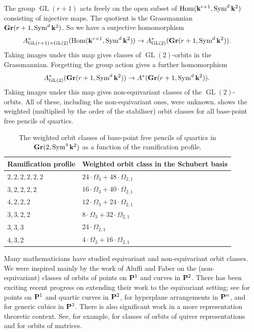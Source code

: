 \documentclass[11pt]{amsart}
\renewcommand {\P}{{\bf P}}
\providecommand {\Gr}{{\bf Gr}}
\providecommand{\GL}{\operatorname{GL}}
\providecommand{\Hom}{\operatorname{Hom}}
\providecommand{\Sym}{\operatorname{Sym}}
\begin{document}
The group \(\GL(r+1)\) acts freely on the open subset of \(\Hom(\k^{r+1}, \Sym^d\k^2)\) consisting of injective maps.
The quotient is the Grassmannian \(\Gr(r+1, \Sym^d\k^2)\).
So we have a surjective homomorphism
\begin{equation}\label{eq:homgrass}
  A^*_{\GL(r+1) \times \GL(2)}(\Hom(\k^{r+1}, \Sym^d\k^2)) \to A^*_{\GL(2)}(\Gr(r+1, \Sym^d\k^2)).
\end{equation}
Taking images under this map gives classes of \(\GL(2)\)-orbits in the Grassmannian.
Forgetting the group action gives a further homomorphism
\begin{equation}\label{eq:homnon}
  A^*_{\GL(2)}(\Gr(r+1, \Sym^d\k^2)) \to A^*(\Gr(r+1, \Sym^d\k^2)).
\end{equation}
Taking images under this map gives non-equivariant classes of the \(\GL(2)\)-orbits.
All of these, including the non-equivariant ones, were unknown.
 shows the weighted (multiplied by the order of the stabiliser) orbit classes for all base-point free pencils of quartics.
\begin{table}
  \begin{tabular}{p{}p{}} 
    \toprule
    Ramification profile & Weighted orbit class in the Schubert basis \\
    \midrule
   \(2,2,2,2,2,2\) & \(24 \cdot \Omega_3 + 48 \cdot \Omega_{2,1}\) \\
    \(3,2,2,2,2\) & \(16 \cdot \Omega_3 + 40 \cdot \Omega_{2,1}\) \\
    \(4,2,2,2\) & \(12 \cdot \Omega_3 + 24 \cdot \Omega_{2,1}\) \\
    \(3,3,2,2\) & \(8 \cdot \Omega_3 + 32 \cdot \Omega_{2,1}\)\\
    \(3,3,3\) & \(24 \cdot \Omega_{2,1}\) \\
    \(4,3,2\) & \(4 \cdot \Omega_3 + 16 \cdot \Omega_{2,1}\)\\
    \bottomrule
  \end{tabular}
  \caption{The weighted orbit classes of base-point free pencils of quartics in \(\Gr(2, \Sym^4\k^2)\) as a function of the ramification profile.}
  \label{tab:quarticpencils}
\end{table}

Many mathematicians have studied equivariant and non-equivariant orbit classes.
We were inspired mainly by the work of Aluffi and Faber \cite{alu.fab:00,alu.fab:93,alu.fab:93*1} on the (non-equivariant) classes of orbits of points on \(\P^{1}\) and curves in \(\P^{2}\).
There has been exciting recent progress on extending their work to the equivariant setting; see \cite{lee.pat.tse:19} for points on \(\P^{1}\) and quartic curves in \(\P^2\), \cite{lee.pat.spi.ea:20} for hyperplane arrangements in \(\P^n\), and \cite{deo.pat.tse:21} for generic cubics in \(\P^3\).
There is also significant work in a more representation theoretic context.
See, for example, \cite{feh.rim.web:20,buc.rim:07} for classes of orbits of quiver representations and \cite{ber.fin:17} for orbits of matrices.
\end{document}
